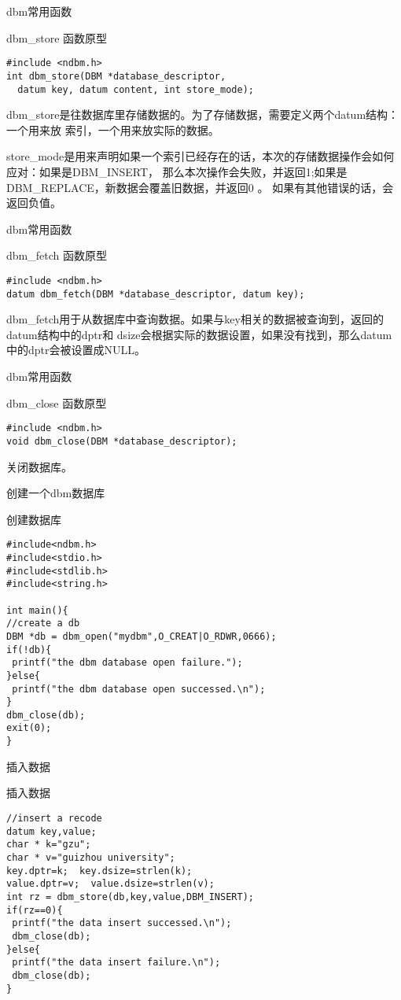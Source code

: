 \documentclass{beamer}
\begin{document}
\begin{frame}[fragile]{dbm常用函数}
\begin{block}{dbm\_store 函数原型}
\begin{lstlisting}
#include <ndbm.h>
int dbm_store(DBM *database_descriptor, 
  datum key, datum content, int store_mode); 
\end{lstlisting}
\end{block}
dbm\_store是往数据库里存储数据的。为了存储数据，需要定义两个datum结构：一个用来放
索引，一个用来放实际的数据。

store\_mode是用来声明如果一个索引已经存在的话，本次的存储数据操作会如何应对：如果是DBM\_INSERT，
那么本次操作会失败，并返回1;如果是DBM\_REPLACE，新数据会覆盖旧数据，并返回0 。
如果有其他错误的话，会返回负值。
\end{frame}
\begin{frame}[fragile]{dbm常用函数}
\begin{block}{dbm\_fetch 函数原型}
\begin{lstlisting}
#include <ndbm.h>
datum dbm_fetch(DBM *database_descriptor, datum key);
\end{lstlisting}
\end{block}
dbm\_fetch用于从数据库中查询数据。如果与key相关的数据被查询到，返回的datum结构中的dptr和
dsize会根据实际的数据设置，如果没有找到，那么datum中的dptr会被设置成NULL。
\end{frame}
\begin{frame}[fragile]{dbm常用函数}
\begin{block}{dbm\_close 函数原型}
\begin{lstlisting}
#include <ndbm.h>
void dbm_close(DBM *database_descriptor);
\end{lstlisting}
\end{block}
关闭数据库。
\end{frame}

\begin{frame}[fragile]{创建一个dbm数据库}
\begin{block}{创建数据库}
\begin{lstlisting}
#include<ndbm.h>
#include<stdio.h>
#include<stdlib.h>
#include<string.h>

int main(){
//create a db
DBM *db = dbm_open("mydbm",O_CREAT|O_RDWR,0666);
if(!db){
 printf("the dbm database open failure.");
}else{
 printf("the dbm database open successed.\n");	
}
dbm_close(db);
exit(0);
}
\end{lstlisting}
\end{block}
\end{frame}
\begin{frame}[fragile]{插入数据}
\begin{block}{插入数据}
\begin{lstlisting}
//insert a recode
datum key,value;
char * k="gzu";
char * v="guizhou university";
key.dptr=k;  key.dsize=strlen(k);
value.dptr=v;  value.dsize=strlen(v);
int rz = dbm_store(db,key,value,DBM_INSERT);
if(rz==0){
 printf("the data insert successed.\n");
 dbm_close(db);	
}else{	
 printf("the data insert failure.\n");
 dbm_close(db);	
}
\end{lstlisting}
\end{block}
\end{frame}
\end{document}
